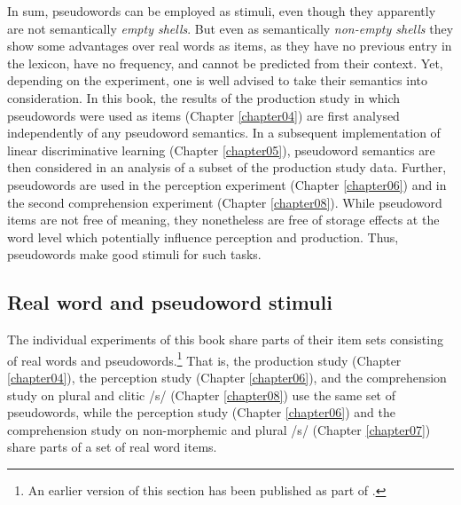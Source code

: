 In sum, pseudowords can be employed as stimuli, even though they apparently are not semantically \textit{empty shells}. But even as semantically \textit{non-empty shells} they show some advantages over real words as items, as they have no previous entry in the lexicon, have no frequency, and cannot be predicted from their context. Yet, depending on the experiment, one is well advised to take their semantics into consideration. In this book, the results of the production study in which pseudowords were used as items (Chapter \ref{chapter04}) are first analysed independently of any pseudoword semantics. In a subsequent implementation of linear discriminative learning (Chapter \ref{chapter05}), pseudoword semantics are then considered in an analysis of a subset of the production study data. Further, pseudowords are used in the perception experiment (Chapter \ref{chapter06}) and in the second comprehension experiment (Chapter \ref{chapter08}). While pseudoword items are not free of meaning, they nonetheless are free of storage effects at the word level which potentially influence perception and production. Thus, pseudowords make good stimuli for such tasks.

\subsection{Real word and pseudoword stimuli}\label{section03_1_2}

The individual experiments of this book share parts of their item sets consisting of real words and pseudowords.\footnote{An earlier version of this section has been published as part of \citet{Schmitz2021a}.} That is, the production study (Chapter \ref{chapter04}), the perception study (Chapter \ref{chapter06}), and the comprehension study on plural and clitic /s/ (Chapter \ref{chapter08}) use the same set of pseudowords, while the perception study (Chapter \ref{chapter06}) and the comprehension study on non-morphemic and plural /s/ (Chapter \ref{chapter07}) share parts of a set of real word items.

